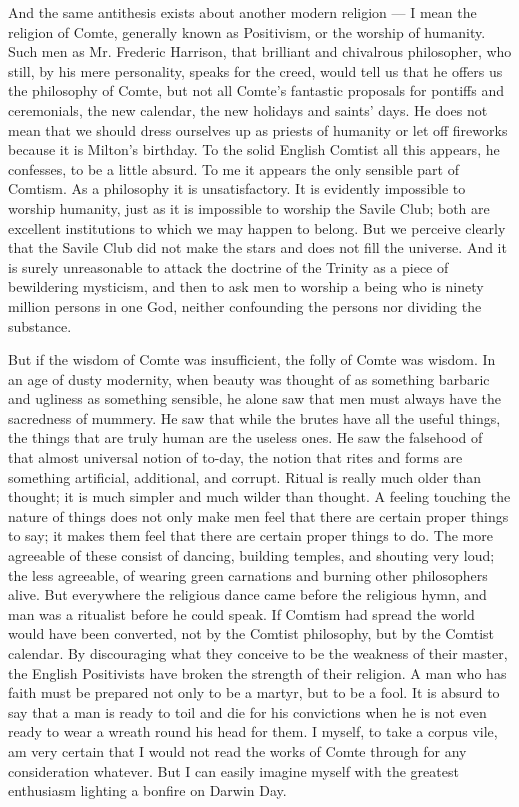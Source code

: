 And the same antithesis exists about another modern religion — I mean the religion of Comte, generally known as Positivism, or the worship of humanity. Such men as Mr. Frederic Harrison, that brilliant and chivalrous philosopher, who still, by his mere personality, speaks for the creed, would tell us that he offers us the philosophy of Comte, but not all Comte’s fantastic proposals for pontiffs and ceremonials, the new calendar, the new holidays and saints’ days. He does not mean that we should dress ourselves up as priests of humanity or let off fireworks because it is Milton’s birthday. To the solid English Comtist all this appears, he confesses, to be a little absurd. To me it appears the only sensible part of Comtism. As a philosophy it is unsatisfactory. It is evidently impossible to worship humanity, just as it is impossible to worship the Savile Club; both are excellent institutions to which we may happen to belong. But we perceive clearly that the Savile Club did not make the stars and does not fill the universe. And it is surely unreasonable to attack the doctrine of the Trinity as a piece of bewildering mysticism, and then to ask men to worship a being who is ninety million persons in one God, neither confounding the persons nor dividing the substance.

But if the wisdom of Comte was insufficient, the folly of Comte was wisdom. In an age of dusty modernity, when beauty was thought of as something barbaric and ugliness as something sensible, he alone saw that men must always have the sacredness of mummery. He saw that while the brutes have all the useful things, the things that are truly human are the useless ones. He saw the falsehood of that almost universal notion of to-day, the notion that rites and forms are something artificial, additional, and corrupt. Ritual is really much older than thought; it is much simpler and much wilder than thought. A feeling touching the nature of things does not only make men feel that there are certain proper things to say; it makes them feel that there are certain proper things to do. The more agreeable of these consist of dancing, building temples, and shouting very loud; the less agreeable, of wearing green carnations and burning other philosophers alive. But everywhere the religious dance came before the religious hymn, and man was a ritualist before he could speak. If Comtism had spread the world would have been converted, not by the Comtist philosophy, but by the Comtist calendar. By discouraging what they conceive to be the weakness of their master, the English Positivists have broken the strength of their religion. A man who has faith must be prepared not only to be a martyr, but to be a fool. It is absurd to say that a man is ready to toil and die for his convictions when he is not even ready to wear a wreath round his head for them. I myself, to take a corpus vile, am very certain that I would not read the works of Comte through for any consideration whatever. But I can easily imagine myself with the greatest enthusiasm lighting a bonfire on Darwin Day.

